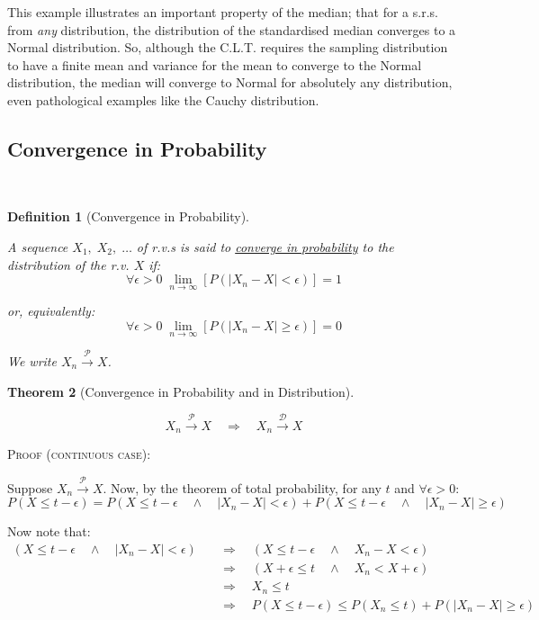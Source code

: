 \documentclass[12pt,a4paper]{article}
\newcommand{\imply}{\quad\Rightarrow\quad}
\newtheorem{thm}{Theorem}[subsection]
\newtheorem{defn}[thm]{Definition}
\newcommand{\AND}{\quad\wedge\quad}
\renewcommand{\imply}{\quad\Rightarrow\quad}
\begin{document}
This example illustrates an important property of the median; that for a s.r.s. from \emph{any} distribution, the distribution of the standardised median converges to a Normal distribution. So, although the C.L.T. requires the sampling distribution to have a finite mean and variance for the mean to converge to the Normal distribution, the median will converge to Normal for absolutely any distribution, even pathological examples like the Cauchy distribution.

\subsection{Convergence in Probability}$\;$

\begin{defn}[Convergence in Probability]$\;$\par\vspace{1cm}

A sequence $X_1,\;X_2,\;\hdots$ of r.v.s is said to \underline{converge in probability} to the distribution of the r.v. $X$ if:
$$\forall\epsilon>0\;\lim_{n\to\infty} \left[P\left(\left|X_n-X\right|<\epsilon\right)\right] = 1$$

or, equivalently:
$$\forall\epsilon >0\;\lim_{n\to\infty}\left[P\left(\left|X_n-X\right|\geq\epsilon\right)\right] = 0$$

We write $X_n \xrightarrow{\mathscr{P}} X$.

\end{defn}

\begin{thm}[Convergence in Probability and in Distribution]$\;$\par\vspace{1cm}

$$X_n\xrightarrow{\mathscr{P}} X \quad\Rightarrow\quad X_n\xrightarrow{\mathscr{D}} X$$

\end{thm}

\noindent\textsc{Proof (continuous case):}\par\vspace{1cm}

Suppose $X_n \xrightarrow{\mathscr{P}}X$. Now, by the theorem of total probability, for any $t$ and $\forall \epsilon>0$:
$$P(X\leq t-\epsilon) = P(X\leq t-\epsilon \AND \left|X_n-X\right| < \epsilon) + P(X\leq t-\epsilon \AND\left|X_n-X\right| \geq \epsilon)$$

Now note that:
\begin{align*}
(X\leq t-\epsilon \AND \left|X_n-X\right| < \epsilon) &\imply (X\leq t-\epsilon \AND X_n-X<\epsilon)\\
&\imply (X+\epsilon\leq t \AND X_n < X + \epsilon)\\
&\imply X_n\leq t\\
&\imply P(X\leq t-\epsilon)\leq P(X_n\leq t) + P(\left|X_n-X\right|\geq \epsilon)
\end{align*}
\end{document}
